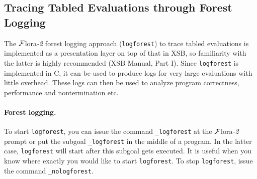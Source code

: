 \documentclass[11pt]{article}
\newcommand{\FLORA}{{\mbox{\sc ${\cal F}${lora}\rm\emph{-2}}}\xspace}
\begin{document}
\subsection{Tracing Tabled Evaluations through Forest Logging}

The \FLORA forest logging approach ({\tt logforest}) to trace tabled evaluations is 
implemented as a presentation layer on top of that in XSB, so familiarity with the
latter is highly recommended (XSB Manual, Part I). Since {\tt logforest} is 
implemented in C, it can be used to produce logs for very large evaluations with
little overhead. These logs can then be used to analyze program correctness, 
performance and nontermination etc. 

\paragraph{Forest logging.}
To start {\tt logforest}, you can issue the command {\tt \_logforest} at the \FLORA
prompt or put the subgoal {\tt \_logforest} in the middle of a program. 
In the latter case, {\tt logforest} will start after this subgoal gets executed. 
It is useful when you know where exactly you would like to start {\tt logforest}. 
To stop {\tt logforest}, issue the command {\tt \_nologforest}. 
\end{document}
